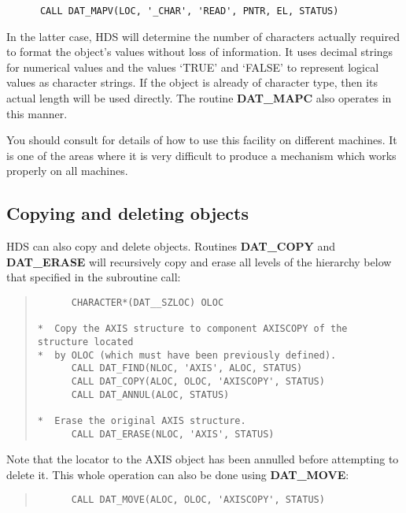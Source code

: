 \begin{small}
\begin{verbatim}
      CALL DAT_MAPV(LOC, '_CHAR', 'READ', PNTR, EL, STATUS)
\end{verbatim}
\end{small}


In the latter case, HDS will determine the number of characters actually
required to format the object's values without loss of information.
It uses decimal strings for numerical values and the values `TRUE' and `FALSE'
to represent logical values as character strings.
If the object is already of character type, then its actual length will be
used directly.
The routine {\bf DAT\_MAPC} also operates in this manner.

You should consult  for details of how to use this
facility on different machines.
It is one of the areas where it is very difficult to produce a mechanism which
works properly on all machines.

\subsection{Copying and deleting objects}

HDS can also copy and delete objects.
Routines {\bf DAT\_COPY} and {\bf DAT\_ERASE} will recursively copy and erase
all levels of the hierarchy below that specified in the subroutine call:

\begin{quote}

\begin{small}
\begin{verbatim}
      CHARACTER*(DAT__SZLOC) OLOC

*  Copy the AXIS structure to component AXISCOPY of the structure located
*  by OLOC (which must have been previously defined).
      CALL DAT_FIND(NLOC, 'AXIS', ALOC, STATUS)
      CALL DAT_COPY(ALOC, OLOC, 'AXISCOPY', STATUS)
      CALL DAT_ANNUL(ALOC, STATUS)

*  Erase the original AXIS structure.
      CALL DAT_ERASE(NLOC, 'AXIS', STATUS)
\end{verbatim}
\end{small}

\end{quote}
Note that the locator to the AXIS object has been annulled before attempting to
delete it.
This whole operation can also be done using {\bf DAT\_MOVE}:
\begin{quote}

\begin{small}
\begin{verbatim}
      CALL DAT_MOVE(ALOC, OLOC, 'AXISCOPY', STATUS)
\end{verbatim}
\end{small}

\end{quote}

